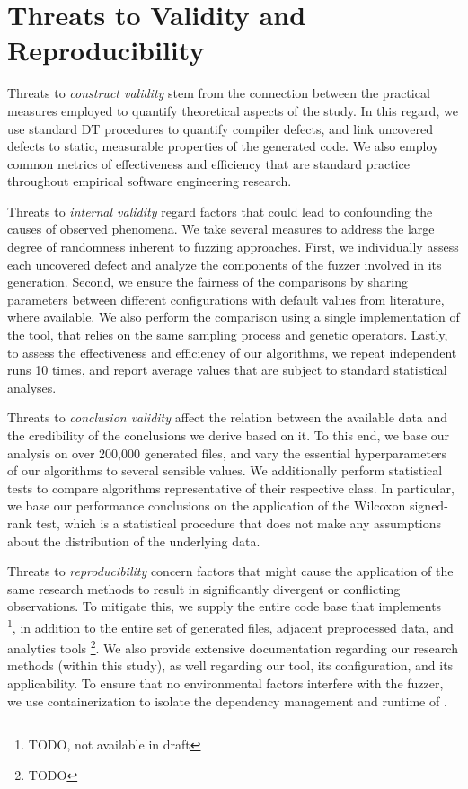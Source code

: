 \section{\label{sec:threats}Threats to Validity and Reproducibility}

Threats to \textit{construct validity} stem from the connection between 
the practical measures employed to quantify theoretical aspects of the study.
In this regard, we use standard \gls{DT} procedures to quantify
compiler defects, and link uncovered defects to static, measurable properties of
the generated code.
We also employ common metrics of effectiveness and efficiency that
are standard practice throughout empirical software engineering research.

Threats to \textit{internal validity} regard factors that could lead
to confounding the causes of observed phenomena.
We take several measures to address the large degree of randomness
inherent to fuzzing approaches.
First, we individually assess each uncovered defect
and analyze the components of the fuzzer involved in its generation.
Second, we ensure the fairness of
the comparisons by sharing parameters
between different configurations with
default values from literature, where available.
We also perform the comparison using a single implementation
of the tool, that relies on the same sampling process and genetic operators.
Lastly, to assess the effectiveness and efficiency of our algorithms,
we repeat independent runs 10 times, and report average values
that are subject to standard statistical analyses.

Threats to \textit{conclusion validity} affect the relation between the available data
and the credibility of the conclusions we derive based on it.
To this end, we base our analysis on over 200,000 generated files,
and vary the essential hyperparameters of our algorithms to several
sensible values.
We additionally perform statistical tests to compare algorithms representative
of their respective class.
In particular, we base our performance conclusions on
the application of the Wilcoxon signed-rank test, which
is a statistical procedure that does not make any assumptions
about the distribution of the underlying data.

Threats to \textit{reproducibility} concern factors that might cause the application
of the same research methods to result in significantly divergent or conflicting observations.
To mitigate this, we supply the entire code base that implements \kf~ \footnote{TODO, not available in draft},
in addition to the entire set of generated files, adjacent preprocessed data, and analytics tools \footnote{TODO}.
We also provide extensive documentation regarding our research methods (within this study),
as well regarding our tool, its configuration, and its applicability.
To ensure that no environmental factors interfere with the fuzzer,
we use containerization to isolate the dependency management and runtime of \kf.

